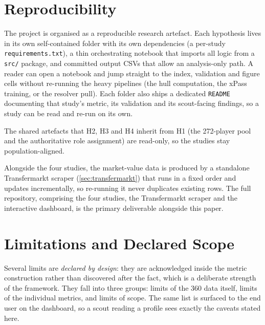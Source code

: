 \documentclass[12pt,a4paper]{article}
\begin{document}
\section{Reproducibility}\label{sec:reproducibility}

The project is organised as a reproducible research artefact.
Each hypothesis lives in its own self-contained folder with its own dependencies (a per-study \texttt{requirements.txt}), a thin orchestrating notebook that imports all logic from a \texttt{src/} package, and committed output CSVs that allow an analysis-only path. A reader can open a notebook and jump straight to the index, validation and figure cells without re-running the heavy pipelines (the hull computation, the xPass training, or the resolver pull). Each folder also ships a dedicated \texttt{README} documenting that study's metric, its validation and its scout-facing findings, so a study can be read and re-run on its own.

The shared artefacts that H2, H3 and H4 inherit from H1 (the 272-player pool and the authoritative role assignment) are read-only, so the studies stay population-aligned.

Alongside the four studies, the market-value data is produced by a standalone Transfermarkt scraper (\cref{sec:transfermarkt}) that runs in a fixed order and updates incrementally, so re-running it never duplicates existing rows. The full repository, comprising the four studies, the Transfermarkt scraper and the interactive dashboard, is the primary deliverable alongside this paper.

\clearpage
\section{Limitations and Declared Scope}\label{sec:limitations}

Several limits are \emph{declared by design}: they are acknowledged inside the metric construction rather than discovered after the fact, which is a deliberate strength of the framework. They fall into three groups: limits of the 360 data itself, limits of the individual metrics, and limits of scope. The same list is surfaced to the end user on the dashboard, so a scout reading a profile sees exactly the caveats stated here.
\end{document}
